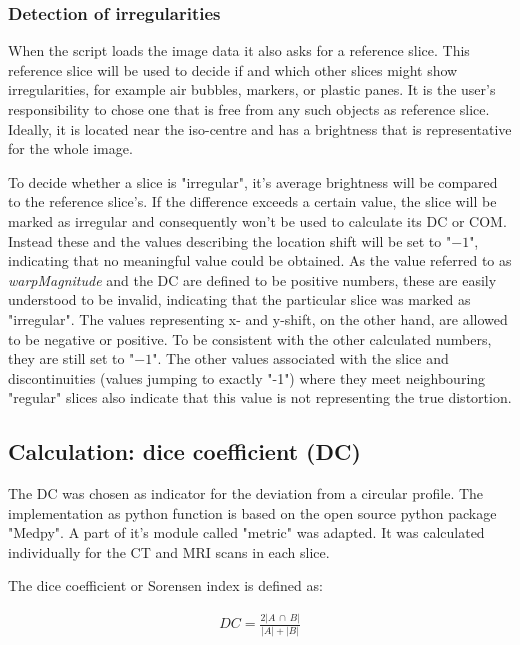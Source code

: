 \subsubsection{Detection of irregularities}

When the script loads the image data it also asks for a reference slice.
This reference slice will be used to decide if and which other slices might show irregularities, for example air bubbles, markers, or plastic panes.
It is the user's responsibility to chose one that is free from any such objects as reference slice.
Ideally, it is located near the iso-centre and has a brightness that is representative for the whole image.

To decide whether a slice is "irregular", it's average brightness will be compared to the reference slice's.
If the difference exceeds a certain value, the slice will be marked as irregular and consequently won't be used to calculate its DC or COM.
Instead these and the values describing the location shift will be set to "$-1$", indicating that no meaningful value could be obtained.
As the value referred to as \textit{warpMagnitude} and the DC are defined to be positive numbers, these are easily understood to be invalid, indicating that the particular slice was marked as "irregular".
The values representing x- and y-shift, on the other hand, are allowed to be negative or positive.
To be consistent with the other calculated numbers, they are still set to "$-1$".
The other values associated with the slice and discontinuities (values jumping to exactly "-1") where they meet neighbouring "regular" slices also indicate that this value is not representing the true distortion.

\subsection{Calculation: dice coefficient (DC)}
\label{sec:DC}

The DC was chosen as indicator for the deviation from a circular profile.
The implementation as python function is based on the open source python package "Medpy". \cite{MedPy} A part of it's module called "metric" was adapted. \cite{MedPy_dc-code}
It was calculated individually for the CT and MRI scans in each slice.

The dice coefficient or Sorensen index \cite{MedPy_dc-doc} is defined as:

\begin{align}
DC = \frac{2 |A \, \cap \, B|}{|A| + |B|}
\end{align}

